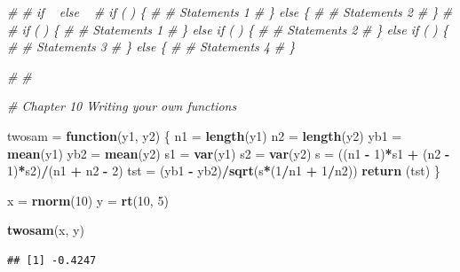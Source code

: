 \documentclass[11pt,]{krantz}
\makeatletter
\newenvironment{Shaded}{\begin{snugshade}}{\end{snugshade}}
\newcommand{\KeywordTok}[1]{\textcolor[rgb]{0.13,0.29,0.53}{\textbf{#1}}}
\newcommand{\DecValTok}[1]{\textcolor[rgb]{0.00,0.00,0.81}{#1}}
\newcommand{\StringTok}[1]{\textcolor[rgb]{0.31,0.60,0.02}{#1}}
\newcommand{\CommentTok}[1]{\textcolor[rgb]{0.56,0.35,0.01}{\textit{#1}}}
\newcommand{\ControlFlowTok}[1]{\textcolor[rgb]{0.13,0.29,0.53}{\textbf{#1}}}
\newcommand{\OperatorTok}[1]{\textcolor[rgb]{0.81,0.36,0.00}{\textbf{#1}}}
\newcommand{\NormalTok}[1]{#1}
\newenvironment{kframe}{%
\medskip{}
\setlength{\fboxsep}{.8em}
 \def\at@end@of@kframe{}%
 \ifinner\ifhmode%
  \def\at@end@of@kframe{\end{minipage}}%
  \begin{minipage}{\columnwidth}%
 \fi\fi%
 \def\FrameCommand##1{\hskip\@totalleftmargin \hskip-\fboxsep
 \colorbox{shadecolor}{##1}\hskip-\fboxsep
     \hskip-\linewidth \hskip-\@totalleftmargin \hskip\columnwidth}%
 \MakeFramed {\advance\hsize-\width
   \@totalleftmargin\z@ \linewidth\hsize
   \@setminipage}}%
 {\par\unskip\endMakeFramed%
 \at@end@of@kframe}
\renewenvironment{Shaded}{\begin{kframe}}{\end{kframe}}
\theoremstyle{definition}
\theoremstyle{definition}
\theoremstyle{remark}
\makeatother
\begin{document}
\begin{Shaded}
\begin{Highlighting}[]
\CommentTok{# # if ~ else ~}
\CommentTok{# if (   ) \{}
\CommentTok{# # Statements 1}
\CommentTok{# \} else \{}
\CommentTok{# # Statements 2}
\CommentTok{# \}}
\CommentTok{# }
\CommentTok{# if (   ) \{}
\CommentTok{# # Statements 1}
\CommentTok{# \} else if (   ) \{}
\CommentTok{# # Statements 2}
\CommentTok{# \} else if (   ) \{}
\CommentTok{# # Statements 3}
\CommentTok{# \} else \{}
\CommentTok{# # Statements 4  }
\CommentTok{# \}}

   
\CommentTok{#}
\CommentTok{#}

\CommentTok{# Chapter 10 Writing your own functions}

\NormalTok{twosam =}\StringTok{ }\ControlFlowTok{function}\NormalTok{(y1, y2) }
\NormalTok{\{}
\NormalTok{  n1  =}\StringTok{ }\KeywordTok{length}\NormalTok{(y1)}
\NormalTok{  n2  =}\StringTok{ }\KeywordTok{length}\NormalTok{(y2)}
\NormalTok{  yb1 =}\StringTok{ }\KeywordTok{mean}\NormalTok{(y1)}
\NormalTok{  yb2 =}\StringTok{ }\KeywordTok{mean}\NormalTok{(y2)}
\NormalTok{  s1  =}\StringTok{ }\KeywordTok{var}\NormalTok{(y1)}
\NormalTok{  s2  =}\StringTok{ }\KeywordTok{var}\NormalTok{(y2) }
\NormalTok{  s   =}\StringTok{ }\NormalTok{((n1 }\OperatorTok{-}\StringTok{ }\DecValTok{1}\NormalTok{)}\OperatorTok{*}\NormalTok{s1 }\OperatorTok{+}\StringTok{ }\NormalTok{(n2 }\OperatorTok{-}\StringTok{ }\DecValTok{1}\NormalTok{)}\OperatorTok{*}\NormalTok{s2)}\OperatorTok{/}\NormalTok{(n1 }\OperatorTok{+}\StringTok{ }\NormalTok{n2 }\OperatorTok{-}\StringTok{ }\DecValTok{2}\NormalTok{)}
\NormalTok{  tst =}\StringTok{ }\NormalTok{(yb1 }\OperatorTok{-}\StringTok{ }\NormalTok{yb2)}\OperatorTok{/}\KeywordTok{sqrt}\NormalTok{(s}\OperatorTok{*}\NormalTok{(}\DecValTok{1}\OperatorTok{/}\NormalTok{n1 }\OperatorTok{+}\StringTok{ }\DecValTok{1}\OperatorTok{/}\NormalTok{n2))}
  \KeywordTok{return}\NormalTok{ (tst)}
\NormalTok{\}}

\NormalTok{x =}\StringTok{ }\KeywordTok{rnorm}\NormalTok{(}\DecValTok{10}\NormalTok{)}
\NormalTok{y =}\StringTok{ }\KeywordTok{rt}\NormalTok{(}\DecValTok{10}\NormalTok{, }\DecValTok{5}\NormalTok{)}

\KeywordTok{twosam}\NormalTok{(x, y)}
\end{Highlighting}
\end{Shaded}

\begin{verbatim}
## [1] -0.4247
\end{verbatim}
\end{document}
